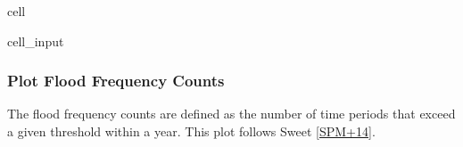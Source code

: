 \documentclass[letterpaper,10pt,english]{jupyterBook}
\begin{document}
\begin{sphinxuseclass}{cell}\begin{sphinxVerbatimInput}

\begin{sphinxuseclass}{cell_input}
\begin{sphinxVerbatim}[commandchars=\\\{\}]
  
  
\end{sphinxVerbatim}

\end{sphinxuseclass}\end{sphinxVerbatimInput}

\end{sphinxuseclass}

\subsubsection{Plot Flood Frequency Counts}
\label{\detokenize{notebooks/FloodFrequency:plot-flood-frequency-counts}}
\sphinxAtStartPar
The flood frequency counts are defined as the number of time periods that exceed a given threshold within a year. This plot follows Sweet  {[}\hyperlink{cite.notebooks/FloodFrequency:id5}{SPM+14}{]}.
\end{document}

